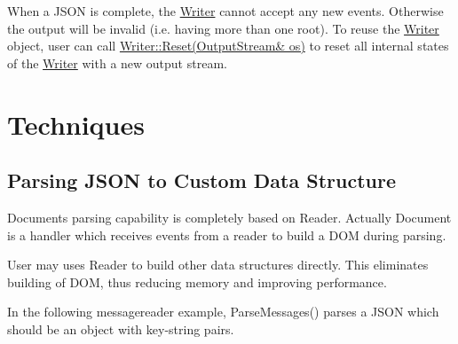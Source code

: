 When a J\+S\+ON is complete, the {\ttfamily \hyperlink{class_writer}{Writer}} cannot accept any new events. Otherwise the output will be invalid (i.\+e. having more than one root). To reuse the {\ttfamily \hyperlink{class_writer}{Writer}} object, user can call {\ttfamily \hyperlink{class_writer_a4e5bd5e6364edca476125b511b3dca9c}{Writer\+::\+Reset(\+Output\+Stream\& os)}} to reset all internal states of the {\ttfamily \hyperlink{class_writer}{Writer}} with a new output stream.\hypertarget{md_Cadriciel_Commun_Externe_RapidJSON_doc_sax.zh-cn_Techniques}{}\section{Techniques}\label{md_Cadriciel_Commun_Externe_RapidJSON_doc_sax.zh-cn_Techniques}
\hypertarget{md_Cadriciel_Commun_Externe_RapidJSON_doc_sax.zh-cn_CustomDataStructure}{}\subsection{Parsing J\+S\+O\+N to Custom Data Structure}\label{md_Cadriciel_Commun_Externe_RapidJSON_doc_sax.zh-cn_CustomDataStructure}
{\ttfamily Document}\textquotesingle{}s parsing capability is completely based on {\ttfamily Reader}. Actually {\ttfamily Document} is a handler which receives events from a reader to build a D\+OM during parsing.

User may uses {\ttfamily Reader} to build other data structures directly. This eliminates building of D\+OM, thus reducing memory and improving performance.

In the following {\ttfamily messagereader} example, {\ttfamily Parse\+Messages()} parses a J\+S\+ON which should be an object with key-\/string pairs.


